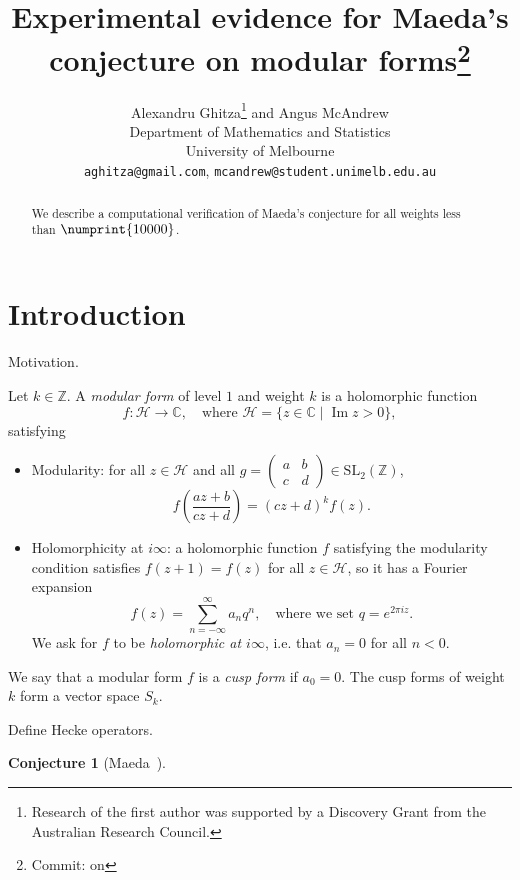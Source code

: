 \documentclass[11pt]{article}
\title{Experimental evidence for Maeda's conjecture on modular forms\footnote{Commit: \gitAbbrevHash{} on \printdate{\gitAuthorDate{}}}
}
\author{
Alexandru Ghitza\footnote{Research of the first author was supported by 
a Discovery Grant from the Australian Research Council.}  
{} and 
Angus McAndrew\\
Department of Mathematics and Statistics\\
University of Melbourne\\
{\tt aghitza@gmail.com}, {\tt mcandrew@student.unimelb.edu.au}
}
\date{}
\theoremstyle{plain}
\newtheorem{conjecture}[theorem]{Conjecture}
\theoremstyle{definition}
\theoremstyle{remark}
\numberwithin{equation}{section}
\numberwithin{table}{section}
\newcommand{\longto}{\longrightarrow}
\newcommand{\CC}{\mathbb{C}}
\newcommand{\ZZ}{\mathbb{Z}}
\newcommand{\HH}{\mathcal{H}}
\renewcommand{\Im}{\operatorname{Im}}
\newcommand{\bound}{\numprint{10000}}
\newcommand{\SL}{\mathrm{SL}}
\begin{document}
\thispagestyle{empty}

\maketitle
\begin{abstract}
  We describe a computational verification of Maeda's conjecture for
  all weights less than $\bound$.
\end{abstract}


\section{Introduction}

Motivation.

Let $k\in\ZZ$.  A \emph{modular form} of level $1$ and weight $k$ is a
holomorphic function
\begin{equation*}
  f\colon\HH\longto\CC, \quad\text{where }
  \HH=\{z\in\CC\mid \Im z>0\},
\end{equation*}
satisfying
\begin{itemize}
  \item Modularity: for all $z\in\HH$ and all
    $g=\left(\begin{smallmatrix}a&b\\c&d\end{smallmatrix}\right)\in\SL_2(\ZZ)$,
      \begin{equation*}
        f\left(\frac{az+b}{cz+d}\right)=(cz+d)^kf(z).
      \end{equation*}
  \item Holomorphicity at $i\infty$: a holomorphic function $f$ satisfying the
    modularity condition satisfies $f(z+1)=f(z)$ for all $z\in\HH$, so it has
    a Fourier expansion
    \begin{equation*}
      f(z)=\sum_{n=-\infty}^\infty a_nq^n,\quad\text{where we set }
      q=e^{2\pi i z}.
    \end{equation*}
    We ask for $f$ to be \emph{holomorphic at $i\infty$}, i.e. that $a_n=0$
    for all $n<0$.
\end{itemize}

We say that a modular form $f$ is a \emph{cusp form} if $a_0=0$.  The cusp
forms of weight $k$ form a vector space $S_k$.

Define Hecke operators.

\begin{conjecture}[Maeda~\cite{Maeda}]
\end{conjecture}
\end{document}
